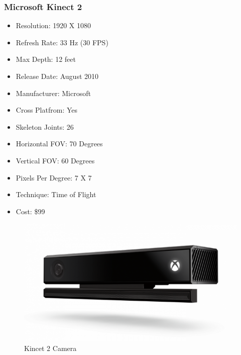 \documentclass[a4paper,10pt,twoside]{article}
\begin{document}
	\subsubsection{Microsoft Kinect 2}
\begin{itemize}
  \item Resolution: 1920 X 1080
  \item Refresh Rate: 33 Hz (30 FPS)
  \item Max Depth: 12 feet
  \item Release Date: August 2010 
  \item Manufacturer: Microsoft
  \item Cross Platfrom: Yes
  \item Skeleton Joints: 26
  \item Horizontal FOV: 70 Degrees
  \item Vertical FOV: 60 Degrees
  \item Pixels Per Degree: 7 X 7
  \item Technique: Time of Flight
  \item Cost: \$99
\end{itemize}
\begin{figure}[H]
	\includegraphics[width=\linewidth,height=\paperheight,keepaspectratio]{kinect2.jpg}
	\caption{Kincet 2 Camera}
	\label{fig:k2Cam}
	\end{figure}
	\pagebreak
	
\end{document}
